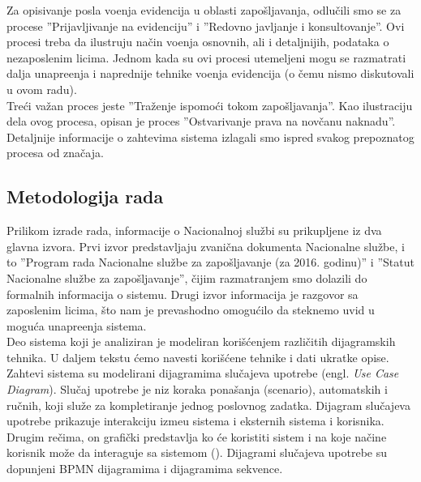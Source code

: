 Za opisivanje posla vo\dj enja evidencija u oblasti zapo\v sljavanja, odlu\v cili smo se za procese ''Prijavljivanje na evidenciju'' i ''Redovno javljanje i konsultovanje''. Ovi procesi treba da ilustruju na\v cin vo\dj enja osnovnih, ali i detaljnijih, podataka o nezaposlenim licima. Jednom kada su ovi procesi utemeljeni mogu se razmatrati dalja unapre\dj enja i naprednije tehnike vo\dj enja evidencija (o \v cemu nismo diskutovali u ovom radu).\\

Tre\'ci va\v zan proces jeste ''Tra\v zenje ispomo\' ci tokom zapo\v sljavanja''. Kao ilustraciju dela ovog procesa, opisan je proces ''Ostvarivanje prava na nov\v canu naknadu''.\\

Detaljnije informacije o zahtevima sistema izlagali smo ispred svakog prepoznatog procesa od zna\v caja.

\subsection{Metodologija rada}

Prilikom izrade rada, informacije o Nacionalnoj slu\v zbi su prikupljene iz dva glavna izvora. Prvi izvor predstavljaju zvani\v cna dokumenta Nacionalne slu\v zbe, i to ''Program rada Nacionalne slu\v zbe za zapo\v sljavanje (za 2016. godinu)'' i ''Statut Nacionalne slu\v zbe za zapo\v sljavanje'', \v cijim razmatranjem smo dolazili do formalnih informacija o sistemu. Drugi izvor informacija je razgovor sa zaposlenim licima, \v sto nam je prevashodno omogu\' cilo da steknemo uvid u mogu\' ca unapre\dj enja sistema.\\

Deo sistema koji je analiziran je modeliran kori\v s\' cenjem razli\v citih dijagramskih tehnika. U daljem tekstu \'cemo navesti kori\v s\'cene tehnike i dati ukratke opise.\\

Zahtevi sistema su modelirani dijagramima slu\v cajeva upotrebe (engl. \textit{Use Case Diagram}). Slu\v caj upotrebe je niz koraka pona\v sanja (scenario), automatskih i ru\v cnih, koji slu\v ze za kompletiranje jednog poslovnog zadatka. Dijagram slu\v cajeva upotrebe prikazuje interakciju izme\dj u sistema i eksternih sistema i korisnika. Drugim re\v cima, on grafi\v cki predstavlja ko \' ce koristiti sistem i na koje na\v cine korisnik mo\v ze da interaguje sa sistemom (\cite{SADM}). Dijagrami slu\v cajeva upotrebe su dopunjeni BPMN dijagramima i dijagramima sekvence.\\

